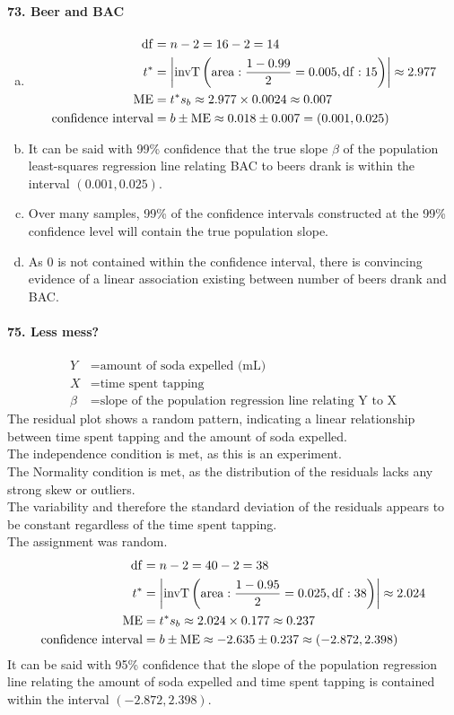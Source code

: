 \documentclass[../Homework]{subfiles}
\begin{document}
		\paragraph{73. Beer and BAC}
			\begin{enumerate}[a.]
				\item
					\begin{align*}
						\operatorname{df} &= n - 2 = 16 - 2 = 14 \\
						t^* &= \left|\operatorname{invT}\left(\operatorname{area}: \frac{1 - 0.99}{2} = 0.005, \operatorname{df}: 15\right)\right| \approx 2.977 \\
						\operatorname{ME} &= t^*s_b \approx 2.977 \times 0.0024 \approx 0.007 \\
						\text{confidence interval} &= b \pm \operatorname{ME} \approx 0.018 \pm 0.007 = (0.001, 0.025)
					\end{align*}
				\item
					It can be said with 99\% confidence that the true slope $\beta$ of the population least-squares regression line relating BAC to beers drank is within the interval $(0.001, 0.025)$.
				\item
					Over many samples, 99\% of the confidence intervals constructed at the 99\% confidence level will contain the true population slope.
				\item
					As 0 is not contained within the confidence interval, there is convincing evidence of a linear association existing between number of beers drank and BAC.
			\end{enumerate}
		\paragraph{75. Less mess?}
			\begin{align*}
				Y &= \text{amount of soda expelled (mL)} \\
				X &= \text{time spent tapping} \\
				\beta &= \text{slope of the population regression line relating Y to X}
			\end{align*}
			The residual plot shows a random pattern, indicating a linear relationship between time spent tapping and the amount of soda expelled. \\
			The independence condition is met, as this is an experiment. \\
			The Normality condition is met, as the distribution of the residuals lacks any strong skew or outliers. \\
			The variability and therefore the standard deviation of the residuals appears to be constant regardless of the time spent tapping. \\
			The assignment was random.
			\begin{align*}
				\operatorname{df} &= n - 2 = 40 - 2 = 38 \\
				t^* &= \left|\operatorname{invT}\left(\operatorname{area}: \frac{1 - 0.95}{2} = 0.025, \operatorname{df}: 38\right)\right| \approx 2.024 \\
				\operatorname{ME} &= t^*s_b \approx 2.024 \times 0.177 \approx 0.237 \\
				\text{confidence interval} &= b \pm \operatorname{ME} \approx -2.635 \pm 0.237 \approx (-2.872, 2.398)
			\end{align*}
			It can be said with 95\% confidence that the slope of the population regression line relating the amount of soda expelled and time spent tapping is contained within the interval $(-2.872, 2.398)$.
\end{document}
